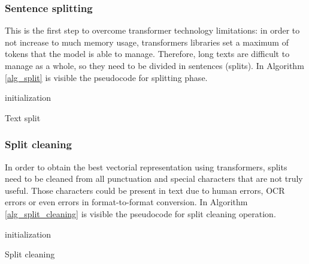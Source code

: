 \documentclass[\main/main.tex]{subfiles}
\begin{document}
\subsubsection{Sentence splitting}
This is the first step to overcome transformer technology limitations: in order to not increase to much memory usage, transformers libraries set a maximum of tokens that the model is able to manage. Therefore, long texts are difficult to manage as a whole, so they need to be divided in sentences (splits). In Algorithm \ref{alg_split} is visible the pseudocode for splitting phase.
\begin{center}
    \begin{algorithm}[H]
     initialization
     \caption{Text split}
     \label{alg_split}
    \end{algorithm}
\end{center}
\subsubsection{Split cleaning}
In order to obtain the best vectorial representation using transformers, splits need to be cleaned from all punctuation and special characters that are not truly useful. Those characters could be present in text due to human errors, OCR errors or even errors in format-to-format conversion. In Algorithm \ref{alg_split_cleaning} is visible the pseudocode for split cleaning operation.
\begin{center}
    \begin{algorithm}[H]
     initialization
     \caption{Split cleaning}
     \label{alg_split_cleaning}
    \end{algorithm}
\end{center}
\end{document}
